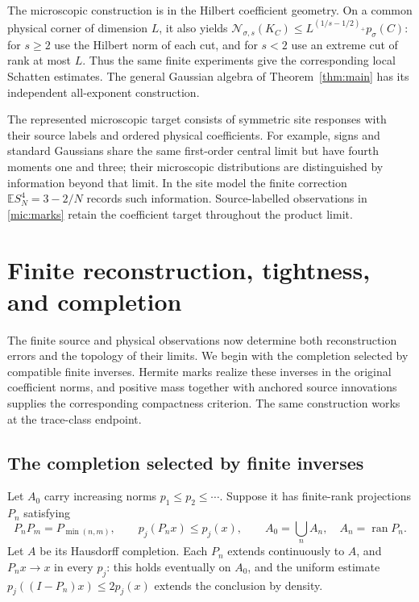 \documentclass[11pt,a4paper]{amsart}
\numberwithin{equation}{section}
\theoremstyle{definition}
\theoremstyle{remark}
\newcommand{\E}{\mathbb E}
\DeclareMathOperator{\ran}{ran}
\begin{document}
The microscopic construction is in the Hilbert coefficient geometry. On a common physical corner of dimension $L$, it also yields
$\mathcal N_{\sigma,s}(K_C)\le L^{(1/s-1/2)_+}p_\sigma(C)$:
for $s\ge2$ use the Hilbert norm of each cut, and for $s<2$ use an extreme cut of rank at most $L$. Thus the same finite experiments give the corresponding local Schatten estimates. The general Gaussian algebra of Theorem~\ref{thm:main} has its independent all-exponent construction.

The represented microscopic target consists of symmetric site responses with their source labels and ordered physical coefficients. For example, signs and standard Gaussians share the same first-order central limit but have fourth moments one and three; their microscopic distributions are distinguished by information beyond that limit. In the site model the finite correction $\E S_N^4=3-2/N$ records such information. Source-labelled observations in \eqref{mic:marks} retain the coefficient target throughout the product limit.

\section{Finite reconstruction, tightness, and completion}\label{sec:data}
The finite source and physical observations now determine both reconstruction errors and the topology of their limits. We begin with the completion selected by compatible finite inverses. Hermite marks realize these inverses in the original coefficient norms, and positive mass together with anchored source innovations supplies the corresponding compactness criterion. The same construction works at the trace-class endpoint.

\subsection{The completion selected by finite inverses}
Let $A_0$ carry increasing norms $p_1\le p_2\le\cdots$. Suppose it has finite-rank projections $P_n$ satisfying
\begin{equation}\label{eq:abstractcuts}
 P_nP_m=P_{\min(n,m)},\qquad p_j(P_nx)\le p_j(x),\qquad
 A_0=\bigcup_n A_n,\quad A_n=\ran P_n.
\end{equation}
Let $A$ be its Hausdorff completion. Each $P_n$ extends continuously to $A$, and $P_nx\to x$ in every $p_j$: this holds eventually on $A_0$, and the uniform estimate $p_j((I-P_n)x)\le2p_j(x)$ extends the conclusion by density.
\end{document}
